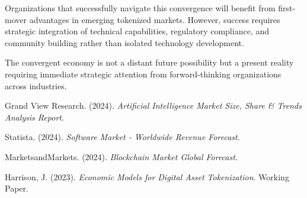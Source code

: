 \documentclass[11pt]{article}
\begin{document}
Organizations that successfully navigate this convergence will benefit from first-mover advantages in emerging tokenized markets. However, success requires strategic integration of technical capabilities, regulatory compliance, and community building rather than isolated technology development.

The convergent economy is not a distant future possibility but a present reality requiring immediate strategic attention from forward-thinking organizations across industries.

\begin{thebibliography}{9}

Grand View Research. (2024). \textit{Artificial Intelligence Market Size, Share \& Trends Analysis Report}.

Statista. (2024). \textit{Software Market - Worldwide Revenue Forecast}.

MarketsandMarkets. (2024). \textit{Blockchain Market Global Forecast}.

Harrison, J. (2023). \textit{Economic Models for Digital Asset Tokenization}. Working Paper.

\end{thebibliography}
\end{document}
